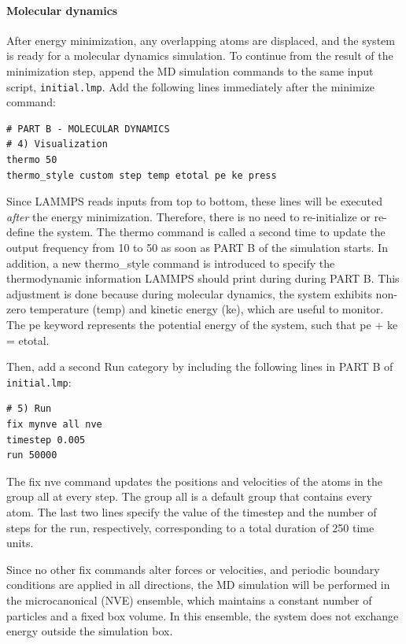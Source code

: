 \documentclass[9pt,tutorial]{livecoms}
\newcommand{\lmpcmd}[1]{\hspace{0pt}\colorbox{listing}{\textcolor{command}{\small{#1}}}\hspace{0pt}} %
\newcommand{\flecmd}[1]{\textcolor{command}{\texttt{#1}}} %
\begin{document}
\paragraph{Molecular dynamics}

After energy minimization, any overlapping atoms are displaced, and
the system is ready for a molecular dynamics simulation.  To continue
from the result of the minimization step, append the MD simulation
commands to the same input script, \flecmd{initial.lmp}.  Add the
following lines immediately after the \lmpcmd{minimize} command:
\begin{lstlisting}
# PART B - MOLECULAR DYNAMICS
# 4) Visualization
thermo 50
thermo_style custom step temp etotal pe ke press
\end{lstlisting}

Since LAMMPS reads inputs from top to bottom, these lines will
be executed \emph{after} the energy minimization.  Therefore,
there is no need to re-initialize or re-define the
system.  The \lmpcmd{thermo} command is called a second time to
update the output frequency from 10 to 50 as soon as \lmpcmd{PART B} of
the simulation starts.  In addition, a new \lmpcmd{thermo\_style}
command is introduced to specify the thermodynamic information LAMMPS should
print during during \lmpcmd{PART B}.  This adjustment is done because during molecular
dynamics, the system exhibits non-zero temperature (\lmpcmd{temp})
and kinetic energy (\lmpcmd{ke}), which are useful to monitor.
The \lmpcmd{pe} keyword represents the potential energy of the system, such that
\lmpcmd{pe} + \lmpcmd{ke} = \lmpcmd{etotal}.

Then, add a second \lmpcmd{Run} category by including the following
lines in \lmpcmd{PART B} of \flecmd{initial.lmp}:
\begin{lstlisting}
# 5) Run
fix mynve all nve
timestep 0.005
run 50000
\end{lstlisting}
The \lmpcmd{fix nve} command updates the positions and
velocities of the atoms in the group \lmpcmd{all} at every step.  The
group \lmpcmd{all} is a default group that contains every atom.  The
last two lines specify the value of the \lmpcmd{timestep} and the number of
steps for the \lmpcmd{run}, respectively, corresponding to a total
duration of 250 time units.

\begin{note}
Since no other fix commands alter forces or velocities,
and periodic boundary conditions are applied in all directions, the MD
simulation will be performed in the microcanonical (NVE) ensemble,
which maintains a constant number of particles and a fixed box volume.
In this ensemble, the system does not exchange energy outside
the simulation box.
\end{note}
\end{document}
